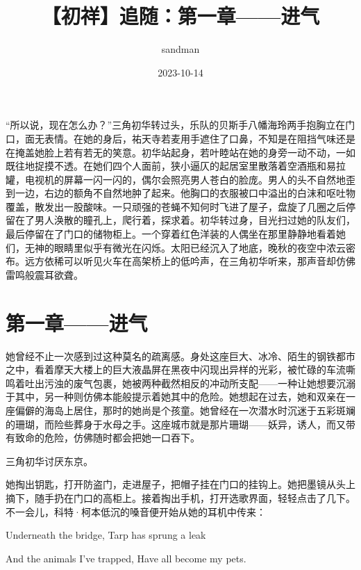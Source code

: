 \documentclass{article}
\title{【初祥】追随：第一章——进气}
\author{sandman}
\date{2023-10-14}
\begin{document}



\Large

“所以说，现在怎么办？”三角初华转过头，乐队的贝斯手八幡海玲两手抱胸立在门口，面无表情。在她的身后，祐天寺若麦用手遮住了口鼻，不知是在阻挡气味还是在掩盖她脸上若有若无的笑意。初华站起身，若叶睦站在她的身旁一动不动，一如既往地捉摸不透。在她们四个人面前，狭小逼仄的起居室里散落着空酒瓶和易拉罐，电视机的屏幕一闪一闪的，偶尔会照亮男人苍白的脸庞。男人的头不自然地歪到一边，右边的额角不自然地肿了起来。他胸口的衣服被口中溢出的白沫和呕吐物覆盖，散发出一股酸味。一只顽强的苍蝇不知何时飞进了屋子，盘旋了几圈之后停留在了男人涣散的瞳孔上，爬行着，探求着。初华转过身，目光扫过她的队友们，最后停留在了门口的储物柜上。一个穿着红色洋装的人偶坐在那里静静地看着她们，无神的眼睛里似乎有微光在闪烁。太阳已经沉入了地底，晚秋的夜空中浓云密布。远方依稀可以听见火车在高架桥上的低吟声，在三角初华听来，那声音却仿佛雷鸣般震耳欲聋。





{\centering\section*{第一章——进气}}





她曾经不止一次感到过这种莫名的疏离感。身处这座巨大、冰冷、陌生的钢铁都市之中，看着摩天大楼上的巨大液晶屏在黑夜中闪现出异样的光彩，被忙碌的车流嘶鸣着吐出污浊的废气包裹，她被两种截然相反的冲动所支配——一种让她想要沉溺于其中，另一种则仿佛本能般提示着她其中的危险。她想起在过去，她和双亲在一座偏僻的海岛上居住，那时的她尚是个孩童。她曾经在一次潜水时沉迷于五彩斑斓的珊瑚，而险些葬身于水母之手。这座城市就是那片珊瑚——妖异，诱人，而又带有致命的危险，仿佛随时都会把她一口吞下。



三角初华讨厌东京。



\newpage



她掏出钥匙，打开防盗门，走进屋子，把帽子挂在门口的挂钩上。她把墨镜从头上摘下，随手扔在门口的高柜上。接着掏出手机，打开选歌界面，轻轻点击了几下。不一会儿，科特·柯本低沉的嗓音便开始从她的耳机中传来：



Underneath the bridge, Tarp has sprung a leak



And the animals I've trapped, Have all become my pets.
\end{document}
